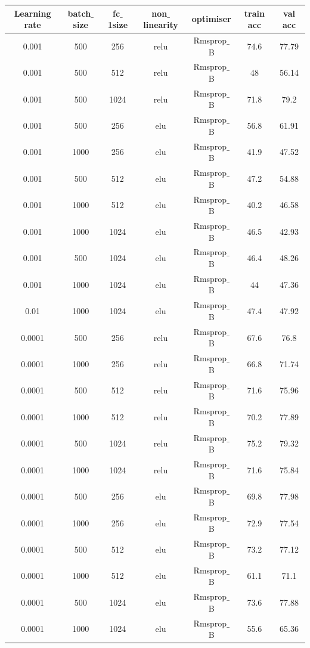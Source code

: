 \documentclass[12pt]{report}
\begin{document}
\begin{table}[H]
	\label{T:equipos}
	\begin{center}
		\begin{tabular}{| c | c | c | c | c | c | c |}
			\hline
			\textbf{Learning rate} & \textbf{batch$\_$size} & \textbf{fc$\_$1size} & \textbf{non$\_$linearity} & \textbf{optimiser} & \textbf{train acc} & \textbf{val acc}\\ 
			\hline
            0.001 & 500 & 256 & relu & Rmsprop$\_$B & 74.6 & 77.79\\
            0.001 & 500 & 512 & relu & Rmsprop$\_$B & 48 & 56.14\\
			0.001 & 500 & 1024 & relu & Rmsprop$\_$B & 71.8 & 79.2\\
            0.001 & 500 & 256 & elu & Rmsprop$\_$B & 56.8 & 61.91\\
            0.001 & 1000 & 256 & elu & Rmsprop$\_$B & 41.9 & 47.52\\
            0.001 & 500 & 512 & elu & Rmsprop$\_$B & 47.2 & 54.88\\
            0.001 & 1000 & 512 & elu & Rmsprop$\_$B & 40.2 & 46.58\\
            0.001 & 1000 & 1024 & elu & Rmsprop$\_$B & 46.5 & 42.93\\
            0.001 & 500 & 1024 & elu & Rmsprop$\_$B & 46.4 & 48.26\\
            0.001 & 1000 & 1024 & elu & Rmsprop$\_$B & 44 & 47.36\\
            0.01 & 1000 & 1024 & elu & Rmsprop$\_$B & 47.4 & 47.92\\
			\hline
            0.0001 & 500 & 256 & relu & Rmsprop$\_$B & 67.6 & 76.8\\
            0.0001 & 1000 & 256 & relu & Rmsprop$\_$B & 66.8 & 71.74\\
            0.0001 & 500 & 512 & relu & Rmsprop$\_$B & 71.6 & 75.96\\
            0.0001 & 1000 & 512 & relu & Rmsprop$\_$B & 70.2 & 77.89\\
            0.0001 & 500 & 1024 & relu & Rmsprop$\_$B & 75.2 & 79.32\\
            0.0001 & 1000 & 1024 & relu & Rmsprop$\_$B & 71.6 & 75.84\\
            0.0001 & 500 & 256 & elu & Rmsprop$\_$B & 69.8 & 77.98\\
            0.0001 & 1000 & 256 & elu & Rmsprop$\_$B & 72.9 & 77.54\\
            0.0001 & 500 & 512 & elu & Rmsprop$\_$B & 73.2 & 77.12\\
            0.0001 & 1000 & 512 & elu & Rmsprop$\_$B & 61.1 & 71.1\\
            0.0001 & 500 & 1024 & elu & Rmsprop$\_$B & 73.6 & 77.88\\
            0.0001 & 1000 & 1024 & elu & Rmsprop$\_$B & 55.6 & 65.36\\
			\hline
		\end{tabular}
	\end{center}
\end{table}
\end{document}
